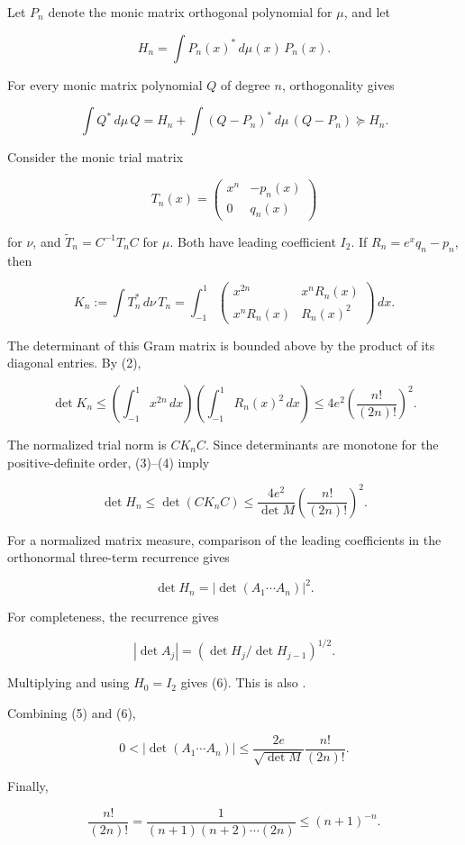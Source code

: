 \documentclass[11pt,a4paper]{article}
\begin{document}
Let \(P_n\) denote the monic matrix orthogonal polynomial for \(\mu\),
and let

\[
H_n=\int P_n(x)^*\,d\mu(x)\,P_n(x).
\]

For every monic matrix polynomial \(Q\) of degree \(n\), orthogonality
gives

\[
\int Q^*\,d\mu\,Q
=H_n+\int(Q-P_n)^*\,d\mu\,(Q-P_n)\succeq H_n.
\tag{3}
\]

Consider the monic trial matrix

\[
T_n(x)=\begin{pmatrix}x^n&-p_n(x)\\0&q_n(x)\end{pmatrix}
\]

for \(\nu\), and \(\widetilde T_n=C^{-1}T_n C\) for \(\mu\). Both have
leading coefficient \(I_2\). If \(R_n=e^xq_n-p_n\), then

\[
K_n:=\int T_n^*\,d\nu\,T_n
=\int_{-1}^1
\begin{pmatrix}x^{2n}&x^nR_n(x)\\x^nR_n(x)&R_n(x)^2\end{pmatrix}\,dx.
\]

The determinant of this Gram matrix is bounded above by the product of
its diagonal entries. By (2),

\[
\det K_n\le
\left(\int_{-1}^1x^{2n}\,dx\right)
\left(\int_{-1}^1R_n(x)^2\,dx\right)
\le4e^2\left(\frac{n!}{(2n)!}\right)^2.
\tag{4}
\]

The normalized trial norm is \(CK_n C\). Since determinants are monotone
for the positive-definite order, (3)--(4) imply

\[
\det H_n\le\det(CK_nC)
\le\frac{4e^2}{\det M}\left(\frac{n!}{(2n)!}\right)^2.
\tag{5}
\]

For a normalized matrix measure, comparison of the leading coefficients
in the orthonormal three-term recurrence gives

\[
\det H_n=|\det(A_1\cdots A_n)|^2.
\tag{6}
\]

For completeness, the recurrence gives

\[
|\det A_j|=(\det H_j/\det H_{j-1})^{1/2}.
\]

Multiplying and using \(H_0=I_2\) gives (6). This is also \cite[Eq.~(2.34)]{DPS08}.

Combining (5) and (6),

\[
0<|\det(A_1\cdots A_n)|
\le \frac{2e}{\sqrt{\det M}}\frac{n!}{(2n)!}.
\]

Finally,

\[
\frac{n!}{(2n)!}
=\frac1{(n+1)(n+2)\cdots(2n)}\le(n+1)^{-n}.
\]
\end{document}
